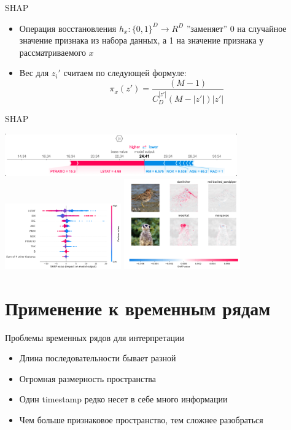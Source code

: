 \documentclass[fleqn, xcolor=x11names]{beamer}
\begin{document}
\begin{frame}{SHAP}
    

    \begin{itemize}
        \item Операция восстановления $h_x:\{0,1\}^D \rightarrow R^D$ ''заменяет'' 0 на случайное значение
        признака из набора данных, а 1 на значение признака у рассматриваемого $x$
        \item Вес для $z_i'$ считаем по следующей формуле:
        $$\pi_x(z') = \frac{(M-1)}{C_{D}^{|z'|}(M-|z'|)|z'|}$$
    \end{itemize}


\end{frame}

\begin{frame}{SHAP}
    
    
    \centering
    \includegraphics[width=10cm]{single_shap.png}
    \centering
    \includegraphics[width=5cm]{summary_shap_0.png}
    \centering
    \includegraphics[width=5cm]{images_shap_0.png}


\end{frame}



\section{Применение к временным рядам}

\begin{frame}{Проблемы временных рядов для интерпретации}

    \begin{itemize}
        \item Длина последовательности бывает разной
        \item Огромная размерность пространства 
        \item Один timestamp редко несет в себе много информации
        \item Чем больше признаковое пространство, тем сложнее разобраться
    \end{itemize}

\end{frame}
\end{document}
